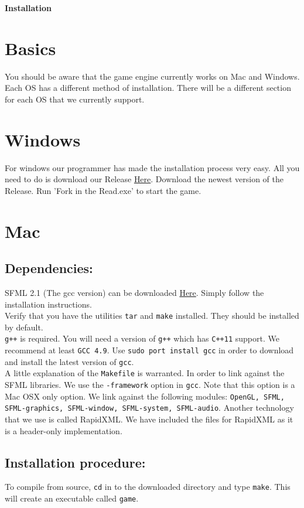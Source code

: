 \documentclass[11pt]{article}
\begin{document}
\begin{center}\huge \bf Installation
\end{center}

\section{Basics}

\indent \indent You should be aware that the game engine currently works on Mac and Windows. Each OS has a different method of installation. There will be a different section for each OS that we currently support.

\section{Windows}

\indent \indent  For windows our programmer has made the installation process very easy. All you need to do is download our Release \href{https://github.com/supreme-committee/text-adventure/releases}{Here}. Download the newest version of the Release. Run 'Fork in the Read.exe' to start the game.

\section{Mac}
\subsection{Dependencies:}
    \indent \indent SFML 2.1 (The gcc version) can be downloaded
    \href{http://www.sfml-dev.org/download/sfml/2.1/}{Here}. Simply follow the installation instructions. \\
    \indent Verify that you have the utilities \texttt{tar} and \texttt{make} installed. 
    They should be installed by default. \\
    \indent \texttt{g++} is required. You will need a version of \texttt{g++} which has \texttt{C++11} support.
    We recommend at least \texttt{GCC 4.9}.
    Use \texttt{sudo port install gcc} in order to download and install the 
    latest version of \texttt{gcc}. \\
    \indent A little explanation of the \texttt{Makefile} is warranted. 
    In order to link against the SFML libraries.
    We use the \texttt{-framework} option in \texttt{gcc}. Note that this option is a Mac OSX only option.
    We link against the following modules: 
    \texttt{OpenGL, SFML, SFML-graphics, SFML-window, SFML-system, SFML-audio}.
    Another technology that we use is called RapidXML. We have included the files for RapidXML as it 
    is a header-only implementation.
    
    
\subsection{Installation procedure:}
    \indent \indent To compile from source, \texttt{cd} in to the downloaded directory and type \texttt{make}.
    This will create an executable called \texttt{game}.
    
\end{document}
